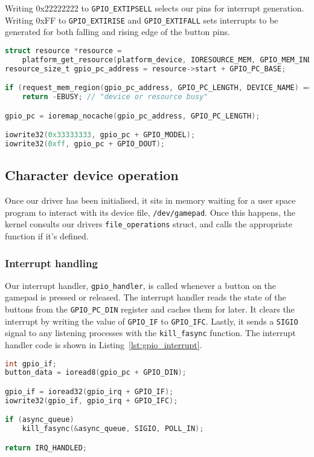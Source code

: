 Writing 0x22222222 to \texttt{GPIO\_EXTIPSELL} selects our pins for interrupt generation. Writing 0xFF to \texttt{GPIO\_EXTIRISE} and \texttt{GPIO\_EXTIFALL} sets interrupts to be generated for both falling and rising edge of the button pins.


\begin{minipage}{\linewidth}
\begin{lstlisting}[language=c, label=lst:gpio_init, caption=GPIO port C initialisation.]
struct resource *resource =
    platform_get_resource(platform_device, IORESOURCE_MEM, GPIO_MEM_INDEX);
resource_size_t gpio_pc_address = resource->start + GPIO_PC_BASE;

if (request_mem_region(gpio_pc_address, GPIO_PC_LENGTH, DEVICE_NAME) == NULL)
    return -EBUSY; // "device or resource busy"

gpio_pc = ioremap_nocache(gpio_pc_address, GPIO_PC_LENGTH);

iowrite32(0x33333333, gpio_pc + GPIO_MODEL);
iowrite32(0xff, gpio_pc + GPIO_DOUT);
\end{lstlisting}
\end{minipage}

\subsection{Character device operation}
Once our driver has been initialised, it sits in memory waiting for a user space program to interact with its device file, \texttt{/dev/gamepad}. Once this happens, the kernel consults our drivers \texttt{file\_operations} struct, and calls the appropriate function if it's defined.

\subsubsection{Interrupt handling}
Our interrupt handler, \texttt{gpio\_handler}, is called whenever a button on the gamepad is pressed or released. The interrupt handler reads the state of the buttons from the \texttt{GPIO\_PC\_DIN} register and caches them for later. It clears the interrupt by writing the value of \texttt{GPIO\_IF} to \texttt{GPIO\_IFC}. Lastly, it sends a \texttt{SIGIO} signal to any listening processes with the \texttt{kill\_fasync} function. The interrupt handler code is shown in Listing~\ref{lst:gpio_interrupt}.

\begin{minipage}{\linewidth}
\begin{lstlisting}[language=c, label=lst:gpio_interrupt, caption=GPIO interrupt handler.]
int gpio_if;
button_data = ioread8(gpio_pc + GPIO_DIN);

gpio_if = ioread32(gpio_irq + GPIO_IF);
iowrite32(gpio_if, gpio_irq + GPIO_IFC);

if (async_queue)
    kill_fasync(&async_queue, SIGIO, POLL_IN);

return IRQ_HANDLED;
\end{lstlisting}
\end{minipage}

